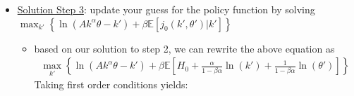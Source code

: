 \documentclass{article}
\begin{document}
\begin{itemize}
\begin{itemize}
\begin{align*}
            J_{0}(k_{0},\theta_{0}) &= \tfrac{1}{1-\beta} \ln (A(1-h)) + \alpha \ln(k_{0}) + \ln(\theta_{0}) + \sum_{t=1}^{\infty} \bigg( \frac{1-\alpha^{t}}{1-\alpha} \ln (h_{0}A) + \alpha^{t}\ln(k_{0}) + \ln(\theta_{t-1}) + \alpha \ln(\theta_{t-2}) + \alpha^{2} \ln (\theta_{t-3}) + \dots + \alpha^{t-1} \ln(\theta_{0}) \bigg) \\
            &= \tfrac{1}{1-\beta} \ln (A(1-h)) + \alpha \ln(k_{0}) + \ln(\theta_{0}) + \sum_{t=1}^{\infty} \left\{ \tfrac{1 - \alpha^{t}}{1 - \alpha} \ln (h_{0}A) \right\} + \sum_{t=1}^{\infty} \left\{ \alpha^{t}\ln(k_{0}) \right\} + \sum_{t=1}^{\infty} \left\{ \ln(\theta_{t-1}) + \alpha \ln(\theta_{t-2}) + \alpha^{2} \ln (\theta_{t-3}) + \dots + \alpha^{t-1} \ln(\theta_{0}) \right\}
        \end{align*}
        Since $\theta$ is i.i.d we have that $E_{0}\theta_{t} = 0 \ \ \forall t >0$ and therefore:
        \begin{align*}
            J_{0}(k_{0},\theta_{0}) &= \overbrace{\tfrac{1}{1 - \beta} \ln (A(1-h)) + \sum_{t=1}^{\infty} \beta_{t} \left\{ \tfrac{1 - \alpha^{t}}{1 - \alpha} \ln (hA) \right\} }^{H} + \alpha \sum_{t=0}^{\infty} (\beta \alpha)^{t} \left\{ \ln (k_{0}) \right\} + (1 + \sum_{t=1}^{\infty}(\beta \alpha)^{t}) \ln (\theta_{0}) \\
            J_{0} (k_{0}, \theta_{0}) &= H + \tfrac{\alpha}{1 - \beta \alpha} \ln (k_{0}) + \sum_{t=0}^{\infty}(\beta \alpha)^{t} \ln(\theta_{0}) \\
            J_{0}(k_{0},\theta_{0}) &= H + \tfrac{\alpha}{1 - \beta \alpha}\ln(k_{0}) + \tfrac{1}{1 - \beta \alpha} \ln (\theta_{0})
        \end{align*}
    \end{itemize}
    \item  \underline{Solution Step 3}: update your guess for the policy function by solving $\max_{k'} \left\{ \ln (Ak^{\alpha}\theta - k') + \beta \mathbb{E} [j_{0} (k',\theta')|k'] \right\}$
    \begin{itemize}
        \item based on our solution to step 2, we can rewrite the above equation as
        \begin{gather*}
            \max_{k'} \left\{ \ln (Ak^{\alpha}\theta - k') + \beta \mathbb{E} [H_{0} + \tfrac{\alpha}{1 - \beta \alpha}\ln(k') + \tfrac{1}{1 - \beta \alpha} \ln (\theta')] \right\}
        \end{gather*}
        Taking first order conditions yields:
        \begin{gather*}

\end{gather*}
\end{itemize}
\end{itemize}
\end{document}
